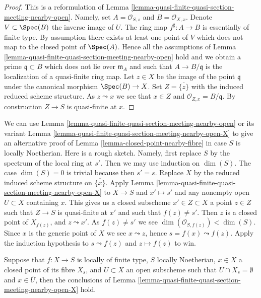 \begin{proof}
This is a reformulation of
Lemma \ref{lemma-quasi-finite-quasi-section-meeting-nearby-open}.
Namely, set $A = \mathcal{O}_{S, s}$ and $B = \mathcal{O}_{X, x}$.
Denote $V \subset \Spec(B)$ the inverse image of $U$.
The ring map $f^\sharp : A \to B$ is essentially of finite type.
By assumption there exists at least one point of $V$ which does not
map to the closed point of $\Spec(A)$. Hence all the assumptions of
Lemma \ref{lemma-quasi-finite-quasi-section-meeting-nearby-open}
hold and we obtain a prime $\mathfrak q \subset B$ which does not
lie over $\mathfrak m_A$ and such that $A \to B/\mathfrak q$ is
the localization of a quasi-finite ring map. Let $z \in X$ be the
image of the point $\mathfrak q$ under the canonical
morphism $\Spec(B) \to X$. Set $Z = \overline{\{z\}}$
with the induced reduced scheme structure. As $z \leadsto x$
we see that $x \in Z$ and $\mathcal{O}_{Z, x} = B/\mathfrak q$.
By construction $Z \to S$ is quasi-finite at $x$.
\end{proof}

\begin{remark}
\label{remark-alternative-closed-point-nearby-fibre}
We can use
Lemma \ref{lemma-quasi-finite-quasi-section-meeting-nearby-open}
or its variant
Lemma \ref{lemma-quasi-finite-quasi-section-meeting-nearby-open-X}
to give an alternative proof of
Lemma \ref{lemma-closed-point-nearby-fibre}
in case $S$ is locally Noetherian.
Here is a rough sketch.
Namely, first replace $S$ by
the spectrum of the local ring at $s'$. Then we may use induction
on $\dim(S)$. The case $\dim(S) = 0$ is trivial because then $s' = s$.
Replace $X$ by the reduced induced scheme structure on $\overline{\{x\}}$.
Apply
Lemma \ref{lemma-quasi-finite-quasi-section-meeting-nearby-open-X}
to $X \to S$ and $x' \mapsto s'$ and any nonempty
open $U \subset X$ containing $x$. This gives us a closed subscheme
$x' \in Z \subset X$ a point $z \in Z$
such that $Z \to S$ is quasi-finite at $x'$ and such that $f(z) \not = s'$.
Then $z$ is a closed point of $X_{f(z)}$, and $z \leadsto x'$.
As $f(z) \not = s'$ we see $\dim(\mathcal{O}_{S, f(z)}) < \dim(S)$.
Since $x$ is the generic point of $X$ we see $x \leadsto z$, hence
$s = f(x) \leadsto f(z)$.
Apply the induction hypothesis to $s \leadsto f(z)$ and $z \mapsto f(z)$
to win.
\end{remark}

\begin{lemma}
\label{lemma-change-hypotheses}
Suppose that $f : X \to S$ is locally of finite type, $S$ locally Noetherian,
$x \in X$ a closed point of its fibre $X_s$, and $U \subset X$ an open
subscheme such that $U \cap X_s = \emptyset$ and $x \in \overline{U}$, then
the conclusions of
Lemma \ref{lemma-quasi-finite-quasi-section-meeting-nearby-open-X}
hold.
\end{lemma}

